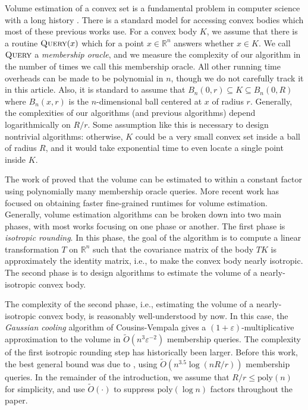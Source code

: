 \documentclass[11pt]{article}
\numberwithin{equation}{section}
\theoremstyle{definition}
\newcommand{\eps}{\varepsilon}
\newcommand{\R}{\mathbb{R}}
\renewcommand{\O}{\widetilde{O}}
\newcommand{\poly}{\mathrm{poly}}
\newcommand{\Query}{\textsc{Query}}
\begin{document}
Volume estimation of a convex set is a fundamental problem in computer science
with a long history
\cite{DFK91:journal,LS93:journal,KLS97:journal,LV06c:journal,LV06b:journal,LV07:journal,CV18:journal}.
There is a standard model for accessing convex bodies which most of these
previous works use.
For a convex body $K$, we assume that there is a routine
$\Query(x)$ which for a point
$x \in \R^n$ answers whether
$x \in K$.
We call $\Query$ a \emph{membership oracle}, and we measure the complexity of
our algorithm in the number of times we call this membership oracle.
All other running time overheads can be made to be polynomial in $n$, though we
do not carefully track it in this article.
Also, it is standard to assume that $B_n(0, r) \subseteq K \subseteq B_n(0, R)$
where
$B_n(x, r)$ is the
$n$-dimensional ball centered at
$x$ of radius
$r$.
Generally, the complexities of our algorithms (and previous algorithms) depend
logarithmically on $R/r$.
Some assumption like this is necessary to design nontrivial algorithms:
otherwise, $K$ could be a very small convex set inside a ball of radius
$R$, and it would take exponential time to even locate a single point inside
$K$.

The work of \cite{DFK91:journal} proved that the volume can be estimated to
within a constant factor using polynomially many membership oracle queries.
More recent work has focused on obtaining faster fine-grained runtimes for
volume estimation.
Generally, volume estimation algorithms can be broken down into two main phases,
with most works focusing on one phase or another.
The first phase is \emph{isotropic rounding}.
In this phase, the goal of the algorithm is to compute a linear transformation
$T$ on
$\R^n$ such that the covariance matrix of the body
$TK$ is approximately the identity matrix, i.e., to make the convex body nearly
isotropic.
The second phase is to design algorithms to estimate the volume of a
nearly-isotropic convex body.

The complexity of the second phase, i.e., estimating the volume of a
nearly-isotropic convex body, is reasonably well-understood by now.
In this case, the \emph{Gaussian cooling} algorithm of Cousins-Vempala
\cite{CV18:journal} gives a $(1+\eps)$-multiplicative approximation to the
volume in
$\O(n^3\eps^{-2})$ membership queries.
The complexity of the first isotropic rounding step has historically been
larger.
Before this work, the best general bound was due to \cite{JLLV26:journal}, using
$\O(n^{3.5} \log(nR/r))$ membership queries.
In the remainder of the introduction, we assume that $R/r \le \poly(n)$ for
simplicity, and use
$\O(\cdot)$ to suppress
$\poly(\log n)$ factors throughout the paper.
\end{document}
